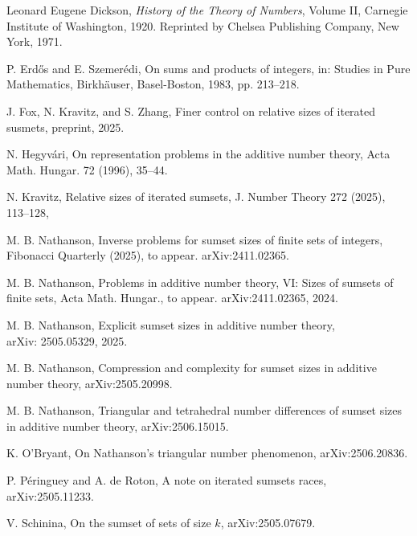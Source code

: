 \documentclass{amsart}
\begin{document}
\begin{thebibliography}{99}

Leonard Eugene Dickson, \emph{History of the Theory of Numbers}, 
Volume II, 
Carnegie Institute of Washington, 1920.
Reprinted by Chelsea Publishing Company, New York, 1971.


P. Erd\H os and E. Szemer\' edi, On sums and products of integers, in:
Studies in Pure Mathematics, Birkh\" auser, Basel-Boston, 1983, pp. 213--218.

J. Fox, N. Kravitz, and S. Zhang,
Finer control on relative sizes of iterated susmets,
preprint, 2025. 


N. Hegyv{\' a}ri, 
On representation problems in the additive number theory, 
Acta Math. Hungar. 72 (1996), 35--44. 

N. Kravitz, Relative sizes of iterated sumsets, 
J. Number Theory 272 (2025), 113--128, 



M.  B. Nathanson, Inverse problems for sumset sizes of finite sets of integers, 
Fibonacci Quarterly (2025), to appear. 
arXiv:2411.02365.

M.  B. Nathanson, Problems in additive number theory, VI:  
Sizes of sumsets of finite sets, 
Acta Math. Hungar., to appear.
arXiv:2411.02365, 2024.

M.  B. Nathanson, 
Explicit sumset sizes in additive number theory, \\
arXiv: 2505.05329, 2025.

M.  B. Nathanson, 
Compression and complexity for sumset sizes in additive number theory,
arXiv:2505.20998. 

M.  B. Nathanson, Triangular and tetrahedral number differences of sumset sizes 
in additive number theory, 
arXiv:2506.15015.


K. O'Bryant, 
On Nathanson's triangular number phenomenon, 
arXiv:2506.20836. 

P. P\' eringuey and A. de Roton, 
A note on iterated sumsets races,
arXiv:2505.11233.  


V. Schinina, On the sumset  of sets of size $k$, 
arXiv:2505.07679.  


\end{thebibliography}
\end{document}
